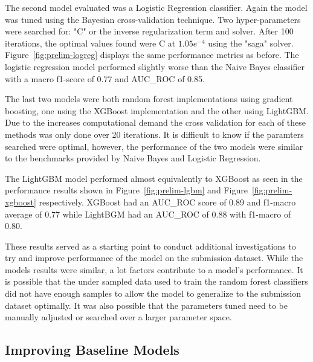 \documentclass[journal,twoside,web]{ieeecolor}
\begin{document}
The second model evaluated was a Logistic Regression classifier. Again the model was tuned using the Bayesian cross-validation technique. Two hyper-parameters were searched for: "C" or the inverse regularization term and solver. After 100 iterations, the optimal values found were C at $1.05e^{-4}$  using the "saga" solver. Figure~\ref{fig:prelim-logreg} displays the same performance metrics as before. The logistic regression model performed slightly worse than the Naive Bayes classifier with a macro f1-score of 0.77 and AUC\_ROC of 0.85. 

The last two models were both random forest implementations using gradient boosting, one using the XGBoost implementation and the other using LightGBM. Due to the increases computational demand the cross validation for each of these methods was only done over 20 iterations. It is difficult to know if the paramters searched were optimal, however, the performance of the two models were similar to the benchmarks provided by Naive Bayes and Logistic Regression.

The LightGBM model performed almost equivalently to XGBoost as seen in the performance results shown in Figure~\ref{fig:prelim-lgbm} and Figure~\ref{fig:prelim-xgboost} respectively. XGBoost had an AUC\_ROC score of 0.89 and f1-macro average of 0.77 while LightBGM had an AUC\_ROC of 0.88 with f1-macro of 0.80.

These results served as a starting point to conduct additional investigations to try and improve performance of the model on the submission dataset. While the models results were similar, a lot factors contribute to a model's performance. It is possible that the under sampled data used to train the random forest classifiers did not have enough samples to allow the model to generalize to the submission dataset optimally. It was also possible that the parameters tuned need to be manually adjusted or searched over a larger parameter space.

\subsection{Improving Baseline Models}
\end{document}

